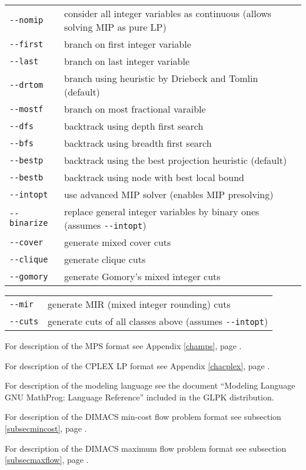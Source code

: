 \noindent
\begin{tabular}{@{}p{30mm}p{92.3mm}@{}}
\verb|--nomip|    &  consider all integer variables as continuous
                     (allows solving MIP as pure LP) \\
\verb|--first|    &  branch on first integer variable \\
\verb|--last|     &  branch on last integer variable \\
\verb|--drtom|    &  branch using heuristic by Driebeck and Tomlin
                     (default) \\
\verb|--mostf|    &  branch on most fractional varaible \\
\verb|--dfs|      &  backtrack using depth first search \\
\verb|--bfs|      &  backtrack using breadth first search \\
\verb|--bestp|    &  backtrack using the best projection heuristic
                     (default) \\
\verb|--bestb|    &  backtrack using node with best local bound \\
\verb|--intopt|   &  use advanced MIP solver (enables MIP presolving)\\
\verb|--binarize| &  replace general integer variables by binary ones
                     (assumes \verb|--intopt|)\\
\verb|--cover|    &  generate mixed cover cuts\\
\verb|--clique|   &  generate clique cuts\\
\verb|--gomory|   &  generate Gomory's mixed integer cuts\\
\end{tabular}

\noindent
\begin{tabular}{@{}p{30mm}p{92.3mm}@{}}
\verb|--mir|      &  generate MIR (mixed integer rounding) cuts\\
\verb|--cuts|     &  generate cuts of all classes above (assumes
                     \verb|--intopt|)\\
\end{tabular}

\bigskip

\noindent
For description of the MPS format see Appendix \ref{champs},
page \pageref{champs}.

\bigskip

\noindent
For description of the CPLEX LP format see Appendix \ref{chacplex},
page \pageref{chacplex}.

\bigskip

\noindent
For description of the modeling language see the document ``Modeling
Language GNU MathProg: Language Reference'' included in the GLPK
distribution.

\bigskip

\noindent
For description of the DIMACS min-cost flow problem format see
subsection \ref{subsecmincost}, page \pageref{subsecmincost}.

\bigskip

\noindent
For description of the DIMACS maximum flow problem format see
subsection \ref{subsecmaxflow}, page \pageref{subsecmaxflow}.

